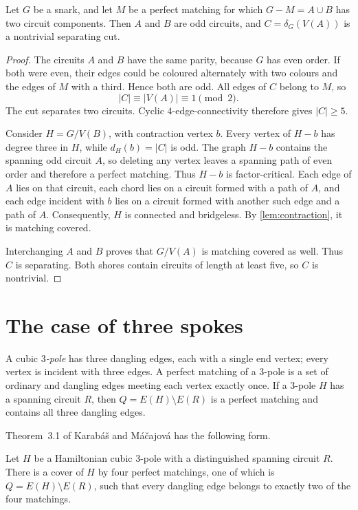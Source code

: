 \documentclass[justified,notoc,twoside,nobib,nofonts]{tufte-handout}
\begin{document}
\begin{lemma}\label{lem:separating}
Let $G$ be a snark, and let $M$ be a perfect matching for which
$G-M=A\cup B$ has two circuit components.
Then $A$ and $B$ are odd circuits, and
$C=\delta_G(V(A))$ is a nontrivial separating cut.
\end{lemma}
\begin{proof}
The circuits $A$ and $B$ have the same parity, because $G$ has even
order. If both were even, their edges could be coloured alternately
with two colours and the edges of $M$ with a third. Hence both are odd.
All edges of $C$ belong to $M$, so
\[
  |C|\equiv |V(A)|\equiv 1\pmod 2.
\]
The cut separates two circuits. Cyclic $4$-edge-connectivity therefore
gives $|C|\ge 5$.

Consider $H=G/V(B)$, with contraction vertex $b$.
Every vertex of $H-b$ has degree three in $H$, while
$d_H(b)=|C|$ is odd. The graph $H-b$ contains the spanning odd circuit
$A$, so deleting any vertex leaves a spanning path of even order and
therefore a perfect matching. Thus $H-b$ is factor-critical.
Each edge of $A$ lies on that circuit, each chord lies on a circuit
formed with a path of $A$, and each edge incident with $b$ lies on a
circuit formed with another such edge and a path of $A$. Consequently,
$H$ is connected and bridgeless. By \cref{lem:contraction}, it is
matching covered.

Interchanging $A$ and $B$ proves that $G/V(A)$ is matching covered as
well. Thus $C$ is separating. Both shores contain circuits of length
at least five, so $C$ is nontrivial.
\end{proof}

\section{The case of three spokes}

A cubic \emph{$3$-pole} has three dangling edges, each with a single
end vertex; every vertex is incident with three edges. A perfect
matching of a $3$-pole is a set of ordinary and dangling edges meeting
each vertex exactly once. If a $3$-pole $H$ has a spanning circuit $R$,
then $Q=E(H)\setminus E(R)$ is a perfect matching and contains all
three dangling edges.

Theorem~3.1 of Karab\'a\v{s} and M\'a\v{c}ajov\'a \citep{KM26} has
the following form.

\begin{theorem}\label{thm:KM}
Let $H$ be a Hamiltonian cubic $3$-pole with a distinguished spanning
circuit $R$. There is a cover of $H$ by four perfect matchings, one
of which is $Q=E(H)\setminus E(R)$, such that every dangling edge
belongs to exactly two of the four matchings.
\end{theorem}
\end{document}
